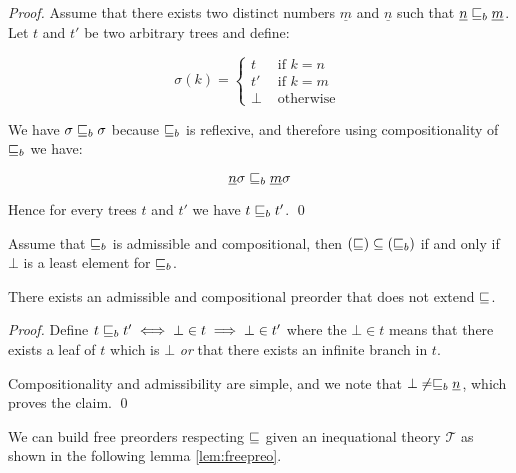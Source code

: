 \begin{proof}
    Assume that there exists two distinct numbers $\underline{m}$
    and $\underline{n}$ such that $\underline{n} \sqsubseteq_b \underline{m}$.
    Let $t$ and $t'$ be 
    two arbitrary trees and define:

    \begin{equation*}
        \sigma(k) = \begin{cases}
            t  & \text{ if } k = n \\
            t' & \text{ if } k = m \\
            \bot  & \text{ otherwise } 
        \end{cases}
    \end{equation*}

    We have $\sigma \sqsubseteq_b \sigma$ because $\sqsubseteq_b$
    is reflexive, and therefore using compositionality 
    of $\sqsubseteq_b$ we have:

    \begin{equation*}
        \underline{n}\sigma \sqsubseteq_b \underline{m}\sigma
    \end{equation*}

    Hence for every trees $t$ and $t'$ we have 
    $t \sqsubseteq_b t'$.
\qed\end{proof}

\begin{alemma}
    \label{lem:coarserpreorder}
    Assume that $\sqsubseteq_b$ is admissible and compositional,
    then $(\sqsubseteq) \subseteq (\sqsubseteq_b)$ if and only if
    $\bot$ is a least element for $\sqsubseteq_b$.
\end{alemma}

    
\begin{example}
    There exists an admissible and compositional 
    preorder that does not extend $\sqsubseteq$.
\end{example}

\begin{proof}
    Define $t \sqsubseteq_b t' \iff \bot \in t \implies \bot \in t'$ where
    the $\bot \in t$ means that there exists a leaf of $t$ 
    which is $\bot$ \emph{or} that there exists an infinite branch 
    in $t$.

    Compositionality and admissibility are simple, and we note 
    that $\bot \neq \sqsubseteq_b \underline{n}$, which proves 
    the claim.
\qed\end{proof}


We can build free preorders respecting $\sqsubseteq$
given an inequational theory $\mathcal{T}$ as shown
in the following lemma \ref{lem:freepreo}.

